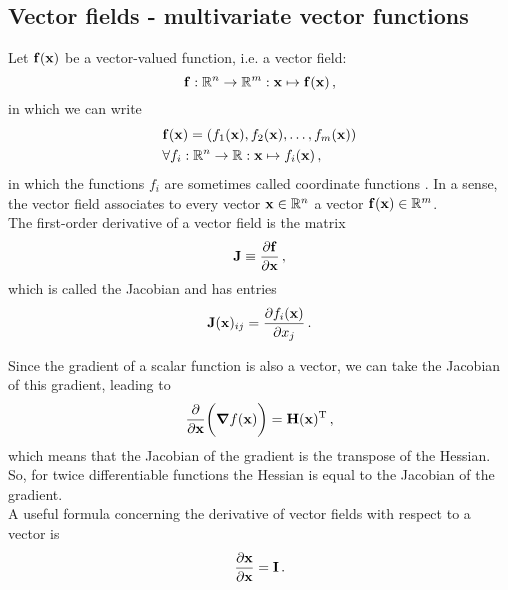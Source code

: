    \subsection{Vector fields - multivariate vector functions}
        Let $\vb{f}(\vb{x})$ be a vector-valued function, i.e. a vector field:
        \begin{equation}
            \vb{f}: \mathbb{R}^n \rightarrow \mathbb{R}^m: \vb{x} \mapsto \vb{f}(\vb{x}) \thinspace ,
        \end{equation}
        in which we can write
        \begin{align} \label{eq:vector_field}
            &\vb{f}(\vb{x}) = (f_1(\vb{x}), f_2(\vb{x}), \dots, f_m(\vb{x})) \\
            &\forall f_i: \mathbb{R}^n \rightarrow \mathbb{R}: \vb{x} \mapsto f_i(\vb{x}) \thinspace ,
        \end{align}
        in which the functions $f_i$ are sometimes called coordinate functions \cite{Burden2011}. In a sense, the vector field associates to every vector $\vb{x} \in \mathbb{R}^n$ a vector $\vb{f}(\vb{x}) \in \mathbb{R}^m$. \\

        The first-order derivative of a vector field is the matrix
        \begin{equation}
            \vb{J} \equiv \pdv{\vb{f}}{\vb{x}} \thinspace ,
        \end{equation}
        which is called the Jacobian and has entries
        \begin{equation} \label{eq:jacobian}
            \vb{J}(\vb{x})_{ij} = \pdv{f_i(\vb{x})}{x_j} \thinspace .
        \end{equation}

        Since the gradient of a scalar function is also a vector, we can take the Jacobian of this gradient, leading to
        \begin{equation}
            \pdv{\vb{x}} \bigg( \grad{f(\vb{x})} \bigg) = \vb{H}(\vb{x})^\text{T} \thinspace ,
        \end{equation}
        which means that the Jacobian of the gradient is the transpose of the Hessian. So, for twice differentiable functions the Hessian is equal to the Jacobian of the gradient. \\

        A useful formula concerning the derivative of vector fields with respect to a vector is
        \begin{align}
            \pdv{\vb{x}}{\vb{x}} = \vb{I} \thinspace .
        \end{align}
